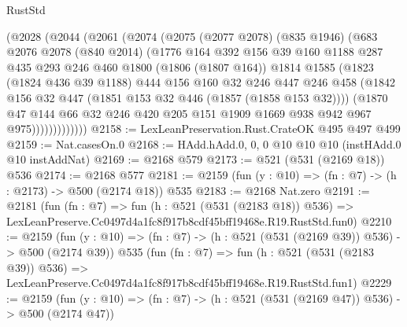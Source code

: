 \begin{lexlean}{RustStd}
\begin{coremodule}
            (@2028
              (@2044
                (@2061
                  (@2074
                    (@2075
                      (@2077 @2078)
                      (@835 @1946)
                      (@683
                        @2076
                        @2078
                        (@840 @2014)
                        (@1776
                          @164
                          @392
                          @156
                          @39
                          @160
                          @1188
                          @287
                          @435
                          @293
                          @246
                          @460
                          @1800
                          (@1806 (@1807 @164))
                          @1814
                          @1585
                          (@1823
                            (@1824 @436 @39 @1188)
                            @444
                            @156
                            @160
                            @32
                            @246
                            @447
                            @246
                            @458
                            (@1842 @156 @32 @447 (@1851 @153 @32 @446 (@1857 (@1858 @153 @32))))
                            (@1870
                              @47
                              @144
                              @66
                              @32
                              @246
                              @420
                              @205
                              @151
                              @1909
                              @1669
                              @938
                              @942
                              @967
                              @975)))))))))))))
@2158 := LexLeanPreservation.Rust.CrateOK @495 @497 @499
@2159 := Nat.casesOn.{0}
@2168 := HAdd.hAdd.{0, 0, 0} @10 @10 @10 (instHAdd.{0} @10 instAddNat)
@2169 := @2168 @579
@2173 := @521 (@531 (@2169 @18)) @536
@2174 := @2168 @577
@2181 := @2159 (fun (y : @10) => (fn : @7) -> (h : @2173) -> @500 (@2174 @18)) @535
@2183 := @2168 Nat.zero
@2191 := @2181
    (fun (fn : @7) =>
    fun (h : @521 (@531 (@2183 @18)) @536) =>
    LexLeanPreserve.Cc0497d4a1fc8f917b8cdf45bff19468e.R19.RustStd.fun0)
@2210 := @2159
    (fun (y : @10) => (fn : @7) -> (h : @521 (@531 (@2169 @39)) @536) -> @500 (@2174 @39))
    @535
    (fun (fn : @7) =>
    fun (h : @521 (@531 (@2183 @39)) @536) =>
    LexLeanPreserve.Cc0497d4a1fc8f917b8cdf45bff19468e.R19.RustStd.fun1)
@2229 := @2159
    (fun (y : @10) => (fn : @7) -> (h : @521 (@531 (@2169 @47)) @536) -> @500 (@2174 @47))

\end{coremodule}
\end{lexlean}
